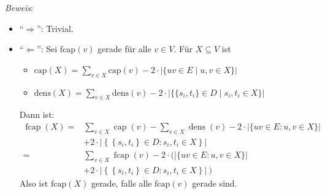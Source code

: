 \textit{Beweis}:
\begin{itemize}
	\item \enquote{$\Rightarrow$}: Trivial.
	\item \enquote{$\Leftarrow$}: Sei $\text{fcap}(v)$ gerade für alle $v\in V$. Für $X\subseteq V$ ist
	\begin{itemize}
		\item $\text{cap}(X)=\sum\limits_{v\in X} \text{cap}(v)-2\cdot |\{uv\in E\mid u,v\in X\}|$
		\item $\text{dens}(X)=\sum\limits_{v\in X}\text{dens}(v)-2\cdot |\{\{s_i,t_i\}\in D\mid s_i,t_i\in X\}|$
	\end{itemize}
	Dann ist:
	$$
	\begin{aligned}
		\operatorname{fcap}(X)= & \sum_{v \in X} \operatorname{cap}(v)-\sum_{v \in X} \operatorname{dens}(v)-2 \cdot|\{uv \in E: u, v \in X\}| \\
		& +2\cdot\left|\left\{\left\{s_{i}, t_{i}\right\} \in D: s_{i}, t_{i} \in X\right\}\right| \\
		= & \sum_{v \in X} \operatorname{fcap}(v)-2 \cdot(|\{uv \in E: u, v \in X\}| \\
		& \left.+2\cdot\left|\left\{\left\{s_{i}, t_{i}\right\} \in D: s_{i}, t_{i} \in X\right\}\right|\right)
	\end{aligned}
	$$
	Also ist $\text{fcap}(X)$ gerade, falls alle $\text{fcap}(v)$ gerade sind.
\end{itemize}